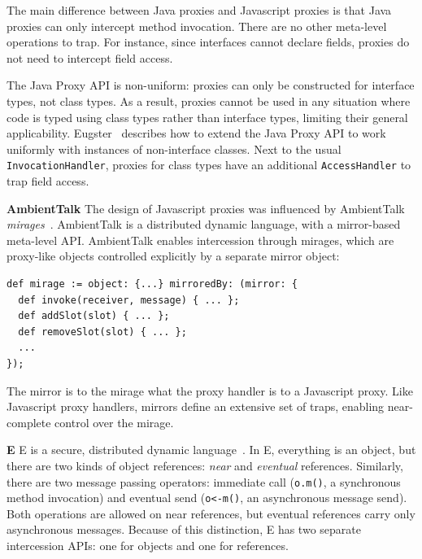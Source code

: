 \documentclass{sig-alternate}
\begin{document}
The main difference between Java proxies and Javascript proxies is that Java proxies can only intercept method invocation. There are no other meta-level operations to trap. For instance, since interfaces cannot declare fields, proxies do not need to intercept field access.

The Java Proxy API is non-uniform: proxies can only be constructed for interface types, not class types. As a result, proxies cannot be used in any situation where code is typed using class types rather than interface types, limiting their general applicability. Eugster~\cite{eugster06uniform} describes how to extend the Java Proxy API to work uniformly with instances of non-interface classes. Next to the usual \texttt{InvocationHandler}, proxies for class types have an additional \texttt{AccessHandler} to trap field access.


\textbf{AmbientTalk} The design of Javascript proxies was influenced by AmbientTalk \emph{mirages}~\cite{mostinckx07behavioral}. AmbientTalk is a distributed dynamic language, with a mirror-based meta-level API. AmbientTalk enables intercession through mirages, which are proxy-like objects controlled explicitly by a separate mirror object:

\begin{lstlisting}[]
def mirage := object: {...} mirroredBy: (mirror: {
  def invoke(receiver, message) { ... };
  def addSlot(slot) { ... };
  def removeSlot(slot) { ... };
  ...
});
\end{lstlisting}

The mirror is to the mirage what the proxy handler is to a Javascript proxy. Like Javascript proxy handlers, mirrors define an extensive set of traps, enabling near-complete control over the mirage.

\textbf{E} E is a secure, distributed dynamic language~\cite{miller05concurrency}. In E, everything is an object, but there are two kinds of object references: \emph{near} and \emph{eventual} references. Similarly, there are two message passing operators: immediate call (\texttt{o.m()}, a synchronous method invocation) and eventual send (\texttt{o<-m()}, an asynchronous message send). Both operations are allowed on near references, but eventual references carry only asynchronous messages. Because of this distinction, E has two separate intercession APIs: one for objects and one for references.
\end{document}
